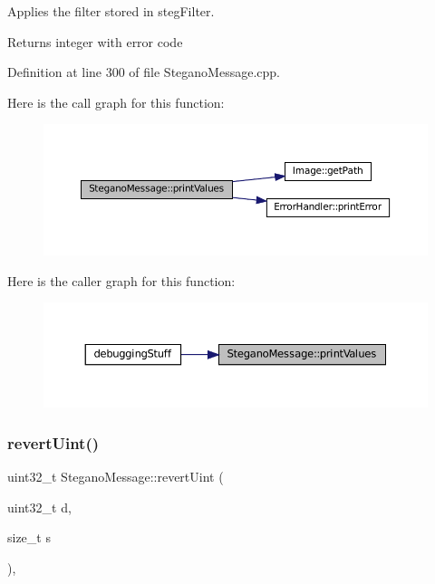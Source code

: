 Applies the filter stored in steg\+Filter. 

\begin{DoxyReturn}{Returns}
integer with error code 
\end{DoxyReturn}


Definition at line 300 of file Stegano\+Message.\+cpp.

Here is the call graph for this function\+:\nopagebreak
\begin{figure}[H]
\begin{center}
\leavevmode
\includegraphics[width=350pt]{classSteganoMessage_a3ea3f5ff720bf56d33f168d47e2897b0_cgraph}
\end{center}
\end{figure}
Here is the caller graph for this function\+:\nopagebreak
\begin{figure}[H]
\begin{center}
\leavevmode
\includegraphics[width=350pt]{classSteganoMessage_a3ea3f5ff720bf56d33f168d47e2897b0_icgraph}
\end{center}
\end{figure}
\mbox{\label{classSteganoMessage_a28fdc9b9da4cbbffed718d351da65fd3}} 
\subsubsection{\texorpdfstring{revertUint()}{revertUint()}}
{\footnotesize\ttfamily uint32\+\_\+t Stegano\+Message\+::revert\+Uint (\begin{DoxyParamCaption}\item[{uint32\+\_\+t}]{d,  }\item[{size\+\_\+t}]{s }\end{DoxyParamCaption})\hspace{0.3cm}{\ttfamily [static]}, {\ttfamily [private]}}



